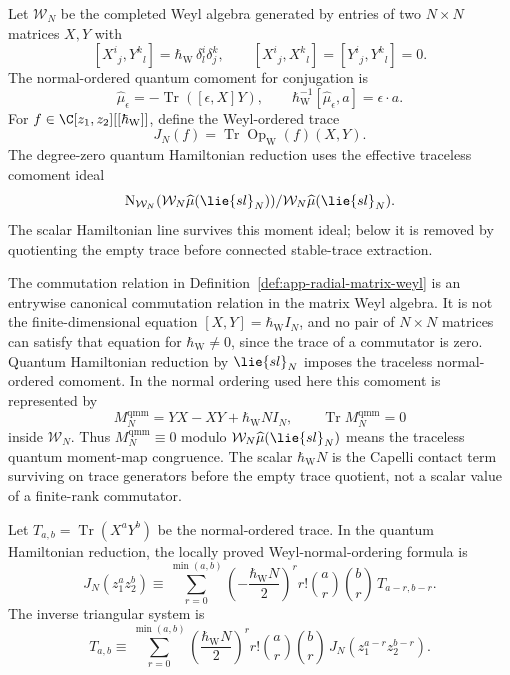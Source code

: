 \begin{defn}
\label{def:app-radial-matrix-weyl}
  Let \(\mathcal W_N\) be the completed Weyl algebra generated by
  entries of two \(N\times N\) matrices \(X,Y\) with
  \[
    [X^i{}_j,Y^k{}_l]=\hbar_{\mathrm{W}}\,\delta^i_l\delta^k_j,\qquad
    [X^i{}_j,X^k{}_l]=[Y^i{}_j,Y^k{}_l]=0.
  \]
  The normal-ordered quantum comoment for conjugation is
  \[
    \widehat\mu_\epsilon=-\operatorname{Tr}([\epsilon,X]Y),
    \qquad
    \hbar_{\mathrm{W}}^{-1}[\widehat\mu_\epsilon,a]=\epsilon\cdot a.
  \]
  For \(f\in\C[z_1,z_2][[\hbar_{\mathrm{W}}]]\), define the Weyl-ordered trace
  \[
    J_N(f)=\operatorname{Tr}\operatorname{Op}_{\mathrm W}(f)(X,Y).
  \]
  The degree-zero quantum Hamiltonian reduction uses the effective
  traceless comoment ideal
  \[
    \mathrm N_{\mathcal W_N}
      (\mathcal W_N\widehat\mu(\lie{sl}_N))/
    \mathcal W_N\widehat\mu(\lie{sl}_N).
  \]
  The scalar Hamiltonian line survives this moment ideal; below it is
  removed by quotienting the empty trace before connected stable-trace
  extraction.
\end{defn}

\begin{rmk}
\label{rmk:app-weyl-versus-matrix-equation}
The commutation relation in Definition~\ref{def:app-radial-matrix-weyl}
is an entrywise canonical commutation relation in the matrix Weyl
algebra.  It is not the finite-dimensional equation
\([X,Y]=\hbar_{\mathrm{W}}I_N\), and no pair of \(N\times N\) matrices
can satisfy that equation for \(\hbar_{\mathrm{W}}\ne0\), since the trace
of a commutator is zero.  Quantum Hamiltonian reduction by
\(\lie{sl}_N\) imposes the traceless normal-ordered comoment.  In the
normal ordering used here this comoment is represented by
\[
  M_N^{\mathrm{qmm}}
  =
  YX-XY+\hbar_{\mathrm{W}}N I_N,
  \qquad
  \operatorname{Tr}M_N^{\mathrm{qmm}}=0
\]
inside \(\mathcal W_N\).  Thus \(M_N^{\mathrm{qmm}}\equiv0\) modulo
\(\mathcal W_N\widehat\mu(\lie{sl}_N)\) means the traceless quantum
moment-map congruence.  The scalar \(\hbar_{\mathrm{W}}N\) is the
Capelli contact term surviving on trace generators before the empty
trace quotient, not a scalar value of a finite-rank commutator.
\end{rmk}

\begin{lem}
\label{lem:app-radial-capelli-triangular}
  Let \(T_{a,b}=\operatorname{Tr}(X^aY^b)\) be the normal-ordered trace.
  In the quantum Hamiltonian reduction, the locally proved
  Weyl-normal-ordering formula is
  \[
    J_N(z_1^az_2^b)\equiv
      \sum_{r=0}^{\min(a,b)}
        \left(-\frac{\hbar_{\mathrm{W}} N}{2}\right)^r
        r!\binom ar\binom br\,T_{a-r,b-r}.
  \]
  The inverse triangular system is
  \[
    T_{a,b}\equiv
      \sum_{r=0}^{\min(a,b)}
        \left(\frac{\hbar_{\mathrm{W}} N}{2}\right)^r
        r!\binom ar\binom br\,J_N(z_1^{a-r}z_2^{b-r}).
  \]
\end{lem}

